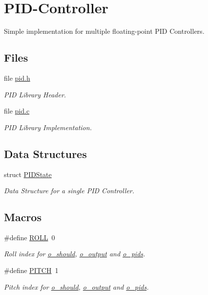 \hypertarget{group__pid}{\section{P\-I\-D-\/\-Controller}
\label{group__pid}
}


Simple implementation for multiple floating-\/point P\-I\-D Controllers.  


\subsection*{Files}
\begin{DoxyCompactItemize}
\item 
file \hyperlink{pid_8h}{pid.\-h}
\begin{DoxyCompactList}\small\item\em P\-I\-D Library Header. \end{DoxyCompactList}\item 
file \hyperlink{pid_8c}{pid.\-c}
\begin{DoxyCompactList}\small\item\em P\-I\-D Library Implementation. \end{DoxyCompactList}\end{DoxyCompactItemize}
\subsection*{Data Structures}
\begin{DoxyCompactItemize}
\item 
struct \hyperlink{struct_p_i_d_state}{P\-I\-D\-State}
\begin{DoxyCompactList}\small\item\em Data Structure for a single P\-I\-D Controller. \end{DoxyCompactList}\end{DoxyCompactItemize}
\subsection*{Macros}
\begin{DoxyCompactItemize}
\item 
\#define \hyperlink{group__pid_gaf902416f65138704a180dbae2dc9d8f2}{R\-O\-L\-L}~0
\begin{DoxyCompactList}\small\item\em Roll index for \hyperlink{group__pid_ga3e9b95260c17d0da155fb4eede660d03}{o\-\_\-should}, \hyperlink{group__pid_gaf457b38bb75f72a89bac9b4a9570bd99}{o\-\_\-output} and \hyperlink{group__pid_gaf8f428e17178b1f15edba7158fd831da}{o\-\_\-pids}. \end{DoxyCompactList}\item 
\#define \hyperlink{group__pid_gacd633835a520a62245ec6cfeb6d00e97}{P\-I\-T\-C\-H}~1
\begin{DoxyCompactList}\small\item\em Pitch index for \hyperlink{group__pid_ga3e9b95260c17d0da155fb4eede660d03}{o\-\_\-should}, \hyperlink{group__pid_gaf457b38bb75f72a89bac9b4a9570bd99}{o\-\_\-output} and \hyperlink{group__pid_gaf8f428e17178b1f15edba7158fd831da}{o\-\_\-pids}. \end{DoxyCompactList}\end{DoxyCompactItemize}
